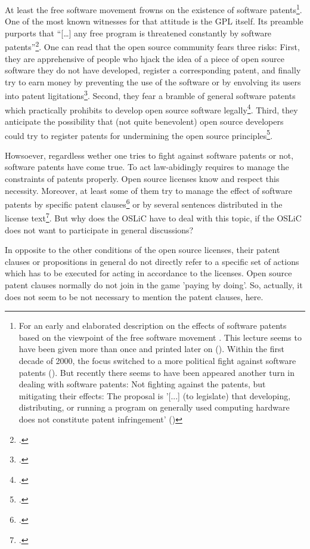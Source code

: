 At least the free software movement frowns on the existence of software
patents\footnote{For an early and elaborated description on the effects of
software patents based on the viewpoint of the free software movement
\cite[see][\nopage wp]{Stallman2001a}. This lecture seems to have been given
more than once and printed later on (\cite[cf.][\nopage wp]{Stallman2002a}).
Within the first decade of 2000, the focus switched to a more political fight
against software patents (\cite[cf.][\nopage wp]{Stallman2004a}). But recently
there seems to have been appeared another turn in dealing with software patents:
Not fighting against the patents, but mitigating their effects: The proposal is
'[...] (to legislate) that developing, distributing, or running a program on
generally used computing hardware does not constitute patent infringement'
(\cite[cf.][\nopage wp]{Stallman2012a})}. One of the most known witnesses for
that attitude is the GPL itself. Its preamble purports that \enquote{[\ldots]
any free program is threatened constantly by software
patents}\footcite[cf.][wp]{Gpl20OsiLicense1991a}. One can read that the open
source community fears three risks: First, they are apprehensive of people who
hjack the idea of a piece of open source software they do not have developed,
register a corresponding patent, and finally try to earn money by preventing the
use of the software or by envolving its users into patent
ligitations\footcite[cf.][234]{JaeMet2011a}. Second, they fear a bramble of
general software patents which practically prohibits to develop open source
software legally\footcite[cf.][234]{JaeMet2011a}. Third, they anticipate the
possibility that (not quite benevolent) open source developers could try to
register patents for undermining the open source
principles\footcite[cf.][235]{JaeMet2011a}.

Howsoever, regardless wether one tries to fight against software patents or not,
software patents have come true. To act law-abidingly requires to manage the
constraints of patents properly. Open source licenses know and respect this
necessity. Moreover, at least some of them try to manage the effect of software
patents by specific patent clauses\footcite[pars pro toto cf.][\nopage wp.
§3]{Apl20OsiLicense2004a} or by several sentences distributed in the license
text\footcite[pars pro toto cf.][\nopage wp.]{Epl10OsiLicense2005a}. But why
does the OSLiC have to deal with this topic, if the OSLiC does not want to
participate in general discussions?

In opposite to the other conditions of the open source licenses, their patent
clauses or propositions in general do not directly refer to a specific set of
actions which has to be executed for acting in accordance to the licenses. Open
source patent clauses normally do not join in the game 'paying by doing'. So,
actually, it does not seem to be not necessary to mention the patent clauses,
here.

